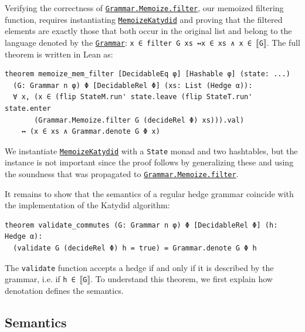 \documentclass[runningheads]{llncs}
\newcommand{\link}[2]{\mbox{\hyperref[#2]{\lstinline{#1}}}\xspace}
\newcommand{\Grammar}{\link{Grammar}{Grammar}}
\newcommand{\GrammarMemoizeFilter}{\link{Grammar.Memoize.filter}{def Grammar.Memoize.filter}}
\newcommand{\MemoizeKatydid}{\link{MemoizeKatydid}{MemoizeKatydid}}
\begin{document}
Verifying the correctness of \GrammarMemoizeFilter, our memoized filtering function, requires instantiating \MemoizeKatydid and proving that the filtered elements are exactly those that both occur in the original list and belong to the language denoted by the \Grammar: \lstinline{x ∈ filter G xs}~\lstinline{↔}\linebreak[0] \lstinline{x ∈ xs ∧ x ∈}~$\llbracket$\lstinline{G}$\rrbracket$.
The full theorem is written in Lean as:
\begin{lstlisting}[label=theorem memoize_mem_filter]
theorem memoize_mem_filter [DecidableEq φ] [Hashable φ] (state: ...)
  (G: Grammar n φ) Φ [DecidableRel Φ] (xs: List (Hedge α)):
  ∀ x, (x ∈ (flip StateM.run' state.leave (flip StateT.run' state.enter
       (Grammar.Memoize.filter G (decideRel Φ) xs))).val)
    ↔ (x ∈ xs ∧ Grammar.denote G Φ x)
\end{lstlisting}
We instantiate \MemoizeKatydid with a \lstinline{State} monad and two hashtables, but the instance is not important since the proof follows by generalizing these and using the soundness that was propagated to \GrammarMemoizeFilter.

It remains to show that the semantics of a regular hedge grammar coincide with the implementation of the Katydid algorithm:
\begin{lstlisting}[label=theorem validate_commutes]
theorem validate_commutes (G: Grammar n φ) Φ [DecidableRel Φ] (h: Hedge α):
  (validate G (decideRel Φ) h = true) = Grammar.denote G Φ h
\end{lstlisting}
The \lstinline{validate} function accepts a hedge if and only if it is described by the grammar, i.e. if \lstinline{h}~\lstinline{∈}~$\llbracket$\lstinline{G}$\rrbracket$.
To understand this theorem, we first explain how denotation defines the semantics.

\subsection{Semantics}
\end{document}
